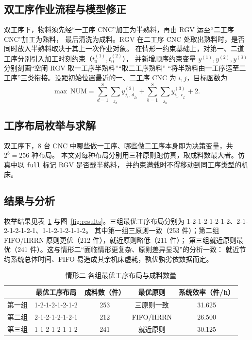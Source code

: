 \documentclass{cumcmthesis}
\begin{document}
\subsection{双工序作业流程与模型修正}
双工序下，物料须先经“一工序 CNC”加工为半熟料，再由 RGV 运至“二工序 CNC”加工为熟料，
最后清洗为成料。RGV 在二工序 CNC 处取出熟料时，是否同时放入半熟料取决于其上一次作业对象。
在情形一约束基础上，对第一、二道工序分别引入加工时刻约束（$t_0^{(1)},t_0^{(2)}$），
并新增顺序约束变量 $y^{(1)},y^{(2)},y^{(3)}$ 分别刻画“空闲 RGV 取一工序半熟料”“取二工序熟料”
“将半熟料由一工序运至二工序”三类衔接。设距初始位置最近的一、二工序 CNC 为 $i,j$，目标函数为
\begin{equation}
\max\ \mathrm{NUM}=\sum_{d=1}^{8}\sum_{j_d}y^{(2)}_{j_1,\,d_{j_d}}
+\sum_{b=1}^{8}\sum_{j_b}y^{(3)}_{i_1,\,c_{j_c}}+2 .
\end{equation}

\subsection{工序布局枚举与求解}
双工序下，8 台 CNC 中哪些做一工序、哪些做二工序本身即为决策变量，共 $2^8=256$ 种布局。
本文对每种布局分别用三种原则跑仿真，取成料数最大者。仿真中以 \texttt{full} 标记 RGV 是否载半熟料，
并约束满载时不得移动到同工序类型的机床。

\subsection{结果与分析}
枚举结果见表~\ref{tab:case2} 与图~\ref{fig:results}。三组最优工序布局分别为 1-2-1-2-1-2-1-2、2-1-2-1-2-1-2-1、1-1-2-1-2-1-1-2。
其中第一组三原则一致（253 件）；第二组 FIFO/HRRN 原则更优（212 件），就近原则略低（211 件）；
第三组就近原则最优（241 件）。这与情形二“面临情形更复杂、原则差异显现”的分析一致：
就近节约系统总体时间、FIFO 易造成其余机床虚耗，孰优孰劣依数据而定。

\begin{table}[!htbp]
\caption{情形二 各组最优工序布局与成料数量}\label{tab:case2}\centering
\small
\begin{tabular}{lcccc}
    \toprule
     & 最优工序布局 & 成料数（件） & 最优原则 & 系统效率（件/h） \\
    \midrule
    第一组 & 1-2-1-2-1-2-1-2 & 253 & 三原则一致 & 31.625 \\
    第二组 & 2-1-2-1-2-1-2-1 & 212 & FIFO/HRRN & 26.500 \\
    第三组 & 1-1-2-1-2-1-1-2 & 241 & 就近原则 & 30.125 \\
    \bottomrule
\end{tabular}
\end{table}
\end{document}
